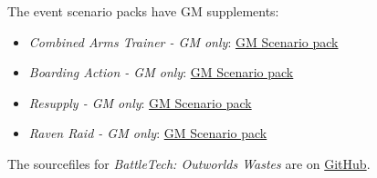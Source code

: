 The event scenario packs have GM supplements:

\begin{itemize}

\item \emph{Combined Arms Trainer - GM only}: \href{https://raw.githubusercontent.com/Eudicods/outworlds-wastes/rules-pdf/combined-arms-trainer-gm-only.pdf}{GM Scenario pack}

\item \emph{Boarding Action - GM only}: \href{https://raw.githubusercontent.com/Eudicods/outworlds-wastes/rules-pdf/boarding-action-gm-only.pdf}{GM Scenario pack}

\item \emph{Resupply - GM only}: \href{https://raw.githubusercontent.com/Eudicods/outworlds-wastes/rules-pdf/resupply-gm-only.pdf}{GM Scenario pack}

\item \emph{Raven Raid - GM only}: \href{https://raw.githubusercontent.com/Eudicods/outworlds-wastes/rules-pdf/raven-raid-gm-only.pdf}{GM Scenario pack}

\end{itemize}

The sourcefiles for \emph{BattleTech: Outworlds Wastes} are on \href{https://github.com/Eudicods/outworlds-wastes}{GitHub}.
